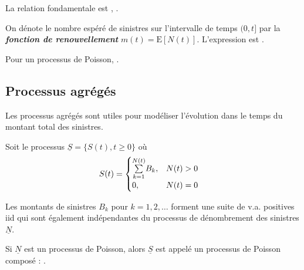 \documentclass[10pt, french]{article}
\begin{document}
\begin{multicols*}{2}
La relation fondamentale est , .

\bigskip

\begin{definitionNOHFILL}
On dénote le nombre espéré de sinistres sur l'intervalle de temps $(0, t]$ par la \textbf{\textit{fonction de renouvellement}} $m(t) = \text{E}[N(t)]$. L'expression est . 

\bigskip

Pour un processus de Poisson, .
\end{definitionNOHFILL}





\columnbreak
\subsection{Processus agrégés}
\begin{rappel_enhanced}[Contexte]
Les processus agrégés sont utiles pour modéliser l'évolution dans le temps du montant total des sinistres. 
\end{rappel_enhanced}


\begin{definitionNOHFILL}
Soit le processus $\underline{S} = \{S(t), t \geq 0\}$ où 
\begin{align*}
	S(t)
	&=	\begin{cases}
		\overset{N(t)}{\underset{k = 1}{\sum}} B_{k},	&	N(t) > 0	\\
		0,							&	N(t) = 0
		\end{cases}
\end{align*}

\bigskip

Les montants de sinistres $B_{k}$ pour $k = 1, 2, \dots$ forment une suite de v.a. positives iid qui sont également indépendantes du processus de dénombrement des sinistres $\underline{N}$.
\end{definitionNOHFILL}

\begin{definitionNOHFILLprop}[Propositions]
Si $\underline{N}$ est un processus de Poisson, alors $\underline{S}$ est appelé un processus de Poisson composé : .
\end{definitionNOHFILLprop}




\end{multicols*}
\end{document}
